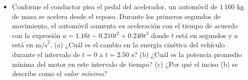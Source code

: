 \documentclass[11pt,a4paper]{article}
\begin{document}
\begin{itemize}
    \item[\textbf{31.}] Conforme el conductor pisa el pedal del acelerador, un automóvil de $1\,160 \text{ kg}$ de masa se acelera desde el reposo. Durante los primeros segundos de movimiento, el automóvil aumenta su aceleración con el tiempo de acuerdo con la expresión $a = 1.16t - 0.210t^2 + 0.240t^3$ donde $t$ está en segundos y $a$ está en $\text{m/s}^2$. (a) ¿Cuál es el cambio en la energía cinética del vehículo durante el intervalo de $t = 0$ a $t = 2.50 \text{ s}$? (b) ¿Cuál es la potencia promedio mínima del motor en este intervalo de tiempo? (c) ¿Por qué el inciso (b) se describe como el \textit{valor mínimo}?
    \vspace*{6cm}
\end{itemize}

\newpage
\end{document}
